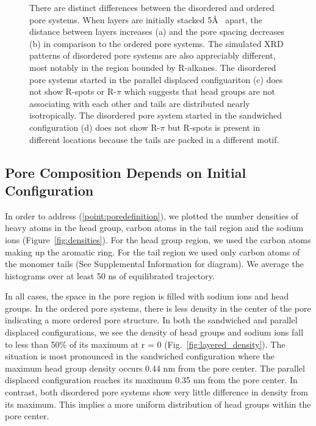 \documentclass{article}
\begin{document}
\begin{figure}[!hbt]
	\caption{There are distinct differences between the disordered and ordered pore systems. 
		When layers are initially stacked 5\AA~ apart, the distance
		between layers increases (a) and the pore spacing decreases (b) in comparison to
		the ordered pore systems. The simulated
		XRD patterns of disordered pore systems are also appreciably different, most 
		notably in the region bounded by R-alkanes. The disordered pore
		systems started in the parallel displaced configuariton (c) does not show R-spots
		or R-$\pi$ which suggests that head groups are not associating with each other
		and tails are distributed nearly isotropically. The disordered pore system
		started in the sandwiched configuration (d) does not show R-$\pi$ but R-spots 
		is present in different locations because the tails are packed in a different
		motif.}
  \end{figure}

  \subsection{Pore Composition Depends on Initial Configuration}

  In order to address (\ref{point:poredefinition}), we plotted the number
  densities of heavy atoms in the head group, carbon atoms in the tail region
  and the sodium ions (Figure~\ref{fig:densities}). For the head group region,
  we used the carbon atoms making up the aromatic ring. For the tail region we
  used only carbon atoms of the monomer tails (See Supplemental Information for
  diagram). We average the histograms over at least 50 ns of equilibrated trajectory.

  In all cases, the space in the pore region is filled with sodium ions and
  head groups. In the ordered pore systems, there is less density in the center of
  the pore indicating a more ordered pore structure. In both the sandwiched and
  parallel displaced configurations, we see the density of head groups and sodium
  ions fall to less than 50\% of its maximum at r = 0
  (Fig.~\ref{fig:layered_density}). The situation is most pronounced in the
  sandwiched configuration where the maximum head group density occurs 0.44 nm
  from the pore center. The parallel displaced configuration reaches its maximum
  0.35 nm from the pore center. In contrast, both disordered pore systems show
  very little difference in density from its maximum. This implies a more uniform
  distribution of head groups within the pore center. 
\end{document}
